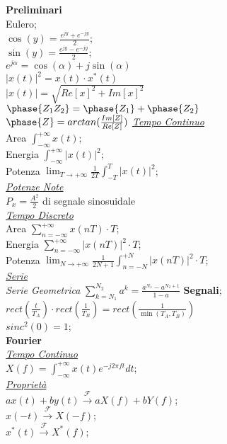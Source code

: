 \documentclass[a4paper]{article}
\begin{document}
\begin{multicols*}{3}
\textbf{Preliminari} \\
Eulero; \\
$\cos(y)=\frac{e^{jy} + e^{-jy}}{2}$; \\
$\sin(y)=\frac{e^{jy} - e^{-jy}}{2}$; \\
$e^{j\alpha}=\cos(\alpha)+j\sin(\alpha)$ \\
$|x(t)|^2=x(t)\cdot x^*(t)$\\
$|x(t)|=\sqrt{{Re[x]}^{2} + {Im[x]}^{2}}$ \\
$\phase{Z_1 Z_2} = \phase{Z_1}+\phase{Z_2}$ \\
$\phase{Z}=arctan(\frac{Im[Z]}{Re[Z]})$
\underline{\textit{Tempo Continuo}} \\
Area $\int_{-\infty}^{+\infty} x(t)$; \\
Energia $\int_{-\infty}^{+\infty} |x(t)|^2$; \\
Potenza 
$\lim_{T \to +\infty}\frac{1}{2T}\int_{-T}^{T}|x(t)|^2$; \\
\underline{\textit{Potenze Note}} \\
$P_x=\frac{{A}^{2}}{2}$ di segnale sinosuidale\\
\underline{\textit{Tempo Discreto}} \\
Area $\sum_{n=-\infty}^{+\infty} x(nT) \cdot T$; \\
Energia $\sum_{n=-\infty}^{+\infty}|x(nT)|^2\cdot T$; \\
Potenza
$\lim_{N \to +\infty}{\frac{1}{2N + 1}\int_{n=-N}^{+N}|x(nT)|^2\cdot T}$; \\
\underline{\textit{Serie}} \\
\textit{Serie Geometrica}
$\sum_{k=N_1}^{N_2}a^k=\frac{a^{N_1}-a^{N_2 + 1}}{1-a}$
\textbf{Segnali}; \\
$rect(\frac{t}{T_A})\cdot rect(\frac{1}{T_B})=rect(\frac{1}{\min(T_A,T_B)})$ \\
$sinc^2(0) = 1$;\\
\textbf{Fourier} \\
\underline{\textit{Tempo Continuo}} \\
$X(f) = \int_{-\infty}^{+\infty} x(t) e^{-j2\pi ft} dt$; \\
\underline{\textit{Proprietà}} \\
$ax(t) + by(t) \xrightarrow{\mathscr{F}} aX(f) + bY(f)$; \\
$x(-t) \xrightarrow{\mathscr{F}} X(-f)$; \\
$x^{*}(t) \xrightarrow{\mathscr{F}} X^{*}(f)$; \\

\end{multicols*}
\end{document}
